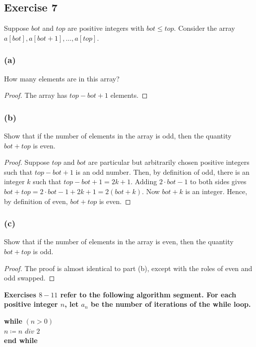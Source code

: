 \documentclass[14pt]{extarticle}
\newcommand{\cy}{\color{cyan}}
\begin{document}
\subsection{Exercise 7}
Suppose \(bot\) and \(top\) are positive integers with \(bot \leq top\). Consider the array
\(a[bot], a[bot + 1], \ldots, a[top]\).

\subsubsection{(a)}
How many elements are in this array?
\begin{proof}
    The array has \(top - bot + 1\) elements.
\end{proof}

\subsubsection{(b)}
Show that if the number of elements in the array is odd, then the quantity \(bot + top\) is even.

\begin{proof}
    Suppose \(top\) and \(bot\) are particular but arbitrarily chosen positive integers such that \(top - bot + 1\) is an odd
    number. Then, by definition of odd, there is an integer \(k\) such that \(top - bot + 1 = 2k + 1\). Adding \(2\cdot bot-1\)
    to both sides gives \(bot + top = 2 \cdot bot - 1 + 2k + 1 = 2(bot + k).\) Now \(bot + k\) is an integer. Hence, by
    definition of even, \(bot + top\) is even.
\end{proof}

\subsubsection{(c)}
Show that if the number of elements in the array is even, then the quantity \(bot + top\) is odd.

\begin{proof}
    The proof is almost identical to part (b), except with the roles of even and odd swapped.
\end{proof}

{\bf \cy Exercises \(8-11\) refer to the following algorithm segment. For each positive integer \(n\), let \(a_n\) be the
number of iterations of the while loop.
\begin{center}
    {\bf while} \((n > 0)\) \\
    \hspace{2cm} \(n \coloneqq n \,\, div \,\, 2\) \\
    {\bf end while}
\end{center}
}
\end{document}
